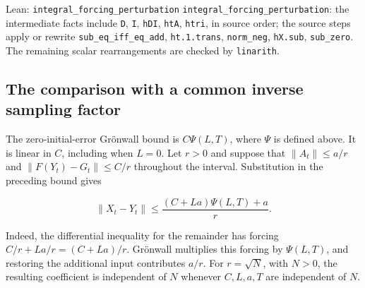 \documentclass[11pt,a4paper]{report}
\begin{document}
\begin{leanbox}{Lean: \texttt{integral\_\allowbreak{}forcing\_\allowbreak{}perturbation}}
\texttt{integral\_\allowbreak{}forcing\_\allowbreak{}perturbation}: the intermediate facts include \texttt{D}, \texttt{I}, \texttt{h\allowbreak{}DI}, \texttt{ht\allowbreak{}A}, \texttt{htri}, in source order; the source steps apply or rewrite \texttt{sub\_\allowbreak{}eq\_\allowbreak{}iff\_\allowbreak{}eq\_\allowbreak{}add}, \texttt{ht.\allowbreak{}1.\allowbreak{}trans}, \texttt{norm\_\allowbreak{}neg}, \texttt{h\allowbreak{}X.\allowbreak{}sub}, \texttt{sub\_\allowbreak{}zero}. The remaining scalar rearrangements are checked by \texttt{linarith}.
\end{leanbox}
\subsection{\texorpdfstring{The comparison with a common inverse sampling factor}{The comparison with a common inverse sampling factor}}
\label{report-step-ProximalLangevin-MeanFieldForcing-lean-2}


The zero-initial-error Grönwall bound is \(C\Psi(L,T)\), where \(\Psi\) is defined above. It is linear in \(C\), including when \(L=0\). Let \(r>0\) and suppose that \(\|A_t\|\le a/r\) and \(\|F(Y_t)-G_t\|\le C/r\) throughout the interval. Substitution in the preceding bound gives

\[\|X_t-Y_t\|\le\frac{(C+La)\Psi(L,T)+a}{r}.\]

Indeed, the differential inequality for the remainder has forcing \(C/r+La/r=(C+La)/r\). Grönwall multiplies this forcing by \(\Psi(L,T)\), and restoring the additional input contributes \(a/r\). For \(r=\sqrt N\), with \(N>0\), the resulting coefficient is independent of \(N\) whenever \(C,L,a,T\) are independent of \(N\).
\end{document}
